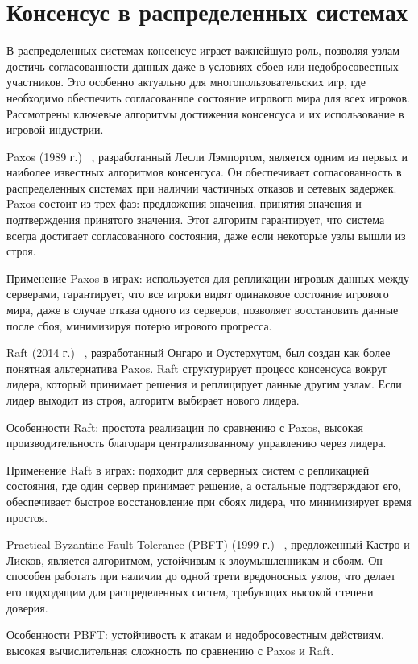 \chapter{Консенсус в распределенных системах}
В распределенных системах консенсус играет важнейшую роль, позволяя узлам достичь согласованности данных даже в условиях сбоев или недобросовестных участников. Это особенно актуально для многопользовательских игр, где необходимо обеспечить согласованное состояние игрового мира для всех игроков. Рассмотрены ключевые алгоритмы достижения консенсуса и их использование в игровой индустрии.

Paxos (1989 г.) ~\cite{b1}, разработанный Лесли Лэмпортом, является одним из первых и наиболее известных алгоритмов консенсуса. Он обеспечивает согласованность в распределенных системах при наличии частичных отказов и сетевых задержек. Paxos состоит из трех фаз: предложения значения, принятия значения и подтверждения принятого значения. Этот алгоритм гарантирует, что система всегда достигает согласованного состояния, даже если некоторые узлы вышли из строя.

Применение Paxos в играх: используется для репликации игровых данных между серверами, гарантирует, что все игроки видят одинаковое состояние игрового мира, даже в случае отказа одного из серверов, позволяет восстановить данные после сбоя, минимизируя потерю игрового прогресса.

Raft (2014 г.) ~\cite{b2}, разработанный Онгаро и Оустерхутом, был создан как более понятная альтернатива Paxos. Raft структурирует процесс консенсуса вокруг лидера, который принимает решения и реплицирует данные другим узлам. Если лидер выходит из строя, алгоритм выбирает нового лидера.

Особенности Raft: простота реализации по сравнению с Paxos, высокая производительность благодаря централизованному управлению через лидера.

Применение Raft в играх: подходит для серверных систем с репликацией состояния, где один сервер принимает решение, а остальные подтверждают его, обеспечивает быстрое восстановление при сбоях лидера, что минимизирует время простоя.

Practical Byzantine Fault Tolerance (PBFT) (1999 г.) ~\cite{b3}, предложенный Кастро и Лисков, является алгоритмом, устойчивым к злоумышленникам и сбоям. Он способен работать при наличии до одной трети вредоносных узлов, что делает его подходящим для распределенных систем, требующих высокой степени доверия.

Особенности PBFT: устойчивость к атакам и недобросовестным действиям, высокая вычислительная сложность по сравнению с Paxos и Raft.

